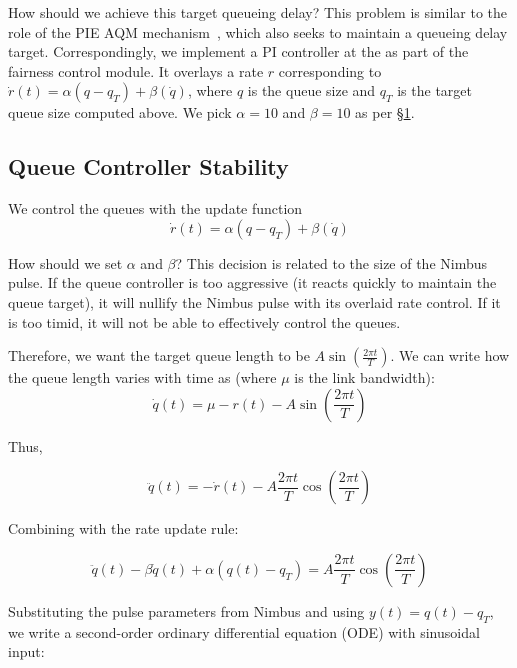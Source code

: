 How should we achieve this target queueing delay? 
This problem is similar to the role of the PIE AQM mechanism~\cite{pie}, which also seeks to maintain a queueing delay target.
Correspondingly, we implement a PI controller at the \inbox as part of the fairness control module. 
It overlays a rate $r$ corresponding to $\dot{r}(t) = \alpha (q - q_T) + \beta (\dot{q})$, where $q$ is the queue size and $q_T$ is the target queue size computed above.
We pick $\alpha = 10$ and $\beta = 10$ as per \S\ref{s:qctl:pi}.

\begin{Appendix}
\section{Queue Controller Stability}\label{s:qctl:pi}

We control the queues with the update function 
\begin{equation} 
    \dot{r}(t) = \alpha (q - q_T) + \beta (\dot{q})
\end{equation}

How should we set $\alpha$ and $\beta$? This decision is related to the size of the Nimbus pulse. 
If the queue controller is too aggressive (\ie it reacts quickly to maintain the queue target), it will nullify the Nimbus pulse with its overlaid rate control.
If it is too timid, it will not be able to effectively control the queues.

Therefore, we want the target queue length to be $A \sin(\frac{2\pi{}t}{T})$. 
We can write how the queue length varies with time as (where $\mu$ is the link bandwidth):
\begin{equation} 
    \dot{q}(t) = \mu - r(t) - A \sin(\frac{2\pi{}t}{T})
\end{equation}

\noindent Thus, 

\begin{equation}
    \ddot{q}(t) = - \dot{r}(t) - A \frac{2\pi{}t}{T} \cos(\frac{2\pi{}t}{T})
\end{equation}

\noindent Combining with the rate update rule:

\begin{equation}
    \ddot{q}(t) - \beta \dot{q}(t) + \alpha (q(t) - q_T) = A \frac{2\pi{}t}{T} \cos(\frac{2\pi{}t}{T})
\end{equation}

\noindent Substituting the pulse parameters from Nimbus and using $y(t) = q(t) - q_T$, we write a second-order ordinary differential equation (ODE) with sinusoidal input:


\end{Appendix}
